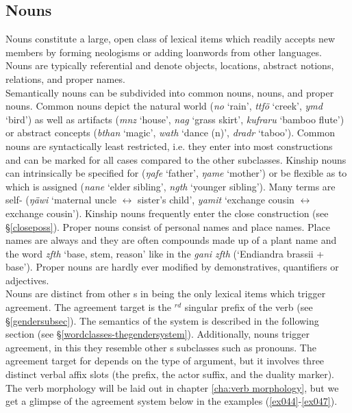 \subsection{Nouns} \label{nouns}

Nouns constitute a large, open class of lexical items which readily accepts new members by forming neologisms or adding loanwords from other languages. Nouns are typically referential and denote objects, locations, abstract notions,  relations, and proper names.\\

Semantically nouns can be subdivided into common nouns,  nouns, and proper nouns. Common nouns depict the natural world (\emph{no} `rain', \emph{ttfö} `creek', \emph{ymd} `bird') as well as artifacts (\emph{mnz} `house', \emph{nag} `grass skirt', \emph{kufraru} `bamboo flute') or abstract concepts (\emph{bthan} `magic', \emph{wath} `dance (n)', \emph{dradr} `taboo'). Common nouns are syntactically least restricted, i.e. they enter into most constructions and can be marked for all cases compared to the other  subclasses. Kinship nouns can intrinsically be specified for  (\emph{ŋafe} `father', \emph{ŋame} `mother') or be flexible as to which  is assigned (\emph{nane} `elder sibling', \emph{ngth} `younger sibling'). Many  terms are self- (\emph{ŋäwi} `maternal uncle $\leftrightarrow$ sister's child', \emph{yamit} `exchange cousin $\leftrightarrow$ exchange cousin'). Kinship nouns frequently enter the close  construction (see \S{}\ref{closeposs}). Proper nouns consist of personal names and place names. Place names are always  and they are often compounds made up of a plant name and the word \emph{zfth} `base, stem, reason' like in the  \emph{gani zfth} (`Endiandra brassii + base'). Proper nouns are hardly ever modified by demonstratives, quantifiers or adjectives.\\

Nouns are distinct from other s in being the only lexical items which trigger  agreement. The agreement target is the \Third{}$^{rd}$  singular prefix of the verb (see \S{}\ref{gendersubsec}). The semantics of the  system is described in the following section (see \S{}\ref{wordclasses-thegendersystem}). Additionally, nouns trigger  agreement, in this they resemble other s subclasses such as pronouns. The agreement target for  depends on the type of argument, but it involves three distinct verbal affix slots (the  prefix, the actor suffix, and the duality marker). The verb morphology will be laid out in chapter \ref{cha:verb morphology}, but we get a glimpse of the agreement system below in the examples (\ref{ex044}-\ref{ex047}).\\

